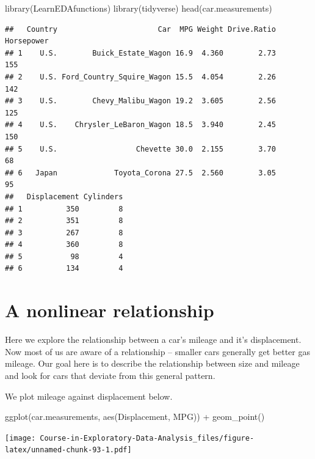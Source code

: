 \documentclass[
]{book}
\newenvironment{Shaded}{\begin{snugshade}}{\end{snugshade}}
\newcommand{\FunctionTok}[1]{\textcolor[rgb]{0.00,0.00,0.00}{#1}}
\newcommand{\NormalTok}[1]{#1}
\newcommand{\SpecialCharTok}[1]{\textcolor[rgb]{0.00,0.00,0.00}{#1}}
\begin{document}
\begin{Shaded}
\begin{Highlighting}[]
\FunctionTok{library}\NormalTok{(LearnEDAfunctions)}
\FunctionTok{library}\NormalTok{(tidyverse)}
\FunctionTok{head}\NormalTok{(car.measurements)}
\end{Highlighting}
\end{Shaded}

\begin{verbatim}
##   Country                       Car  MPG Weight Drive.Ratio Horsepower
## 1    U.S.        Buick_Estate_Wagon 16.9  4.360        2.73        155
## 2    U.S. Ford_Country_Squire_Wagon 15.5  4.054        2.26        142
## 3    U.S.        Chevy_Malibu_Wagon 19.2  3.605        2.56        125
## 4    U.S.    Chrysler_LeBaron_Wagon 18.5  3.940        2.45        150
## 5    U.S.                  Chevette 30.0  2.155        3.70         68
## 6   Japan             Toyota_Corona 27.5  2.560        3.05         95
##   Displacement Cylinders
## 1          350         8
## 2          351         8
## 3          267         8
## 4          360         8
## 5           98         4
## 6          134         4
\end{verbatim}

\hypertarget{a-nonlinear-relationship}{%
\section{A nonlinear relationship}\label{a-nonlinear-relationship}}

Here we explore the relationship between a car's mileage and it's displacement. Now most of us are aware of a relationship -- smaller cars generally get better gas mileage. Our goal here is to describe the relationship between size and mileage and look for cars that deviate from this general pattern.

We plot mileage against displacement below.

\begin{Shaded}
\begin{Highlighting}[]
\FunctionTok{ggplot}\NormalTok{(car.measurements,}
       \FunctionTok{aes}\NormalTok{(Displacement, MPG)) }\SpecialCharTok{+}
  \FunctionTok{geom\_point}\NormalTok{()}
\end{Highlighting}
\end{Shaded}

\texttt{[image: Course-in-Exploratory-Data-Analysis\_files/figure-latex/unnamed-chunk-93-1.pdf]}
\end{document}
